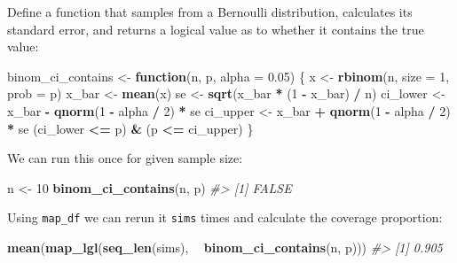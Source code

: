 \documentclass[]{book}
\newenvironment{Shaded}{\begin{snugshade}}{\end{snugshade}}
\newcommand{\KeywordTok}[1]{\textcolor[rgb]{0.13,0.29,0.53}{\textbf{#1}}}
\newcommand{\DataTypeTok}[1]{\textcolor[rgb]{0.13,0.29,0.53}{#1}}
\newcommand{\DecValTok}[1]{\textcolor[rgb]{0.00,0.00,0.81}{#1}}
\newcommand{\FloatTok}[1]{\textcolor[rgb]{0.00,0.00,0.81}{#1}}
\newcommand{\StringTok}[1]{\textcolor[rgb]{0.31,0.60,0.02}{#1}}
\newcommand{\CommentTok}[1]{\textcolor[rgb]{0.56,0.35,0.01}{\textit{#1}}}
\newcommand{\ControlFlowTok}[1]{\textcolor[rgb]{0.13,0.29,0.53}{\textbf{#1}}}
\newcommand{\OperatorTok}[1]{\textcolor[rgb]{0.81,0.36,0.00}{\textbf{#1}}}
\newcommand{\NormalTok}[1]{#1}
\theoremstyle{definition}
\theoremstyle{definition}
\theoremstyle{definition}
\theoremstyle{remark}
\begin{document}
Define a function that samples from a Bernoulli distribution, calculates
its standard error, and returns a logical value as to whether it
contains the true value:

\begin{Shaded}
\begin{Highlighting}[]
\NormalTok{binom_ci_contains <-}\StringTok{ }\ControlFlowTok{function}\NormalTok{(n, p, }\DataTypeTok{alpha =} \FloatTok{0.05}\NormalTok{) \{}
\NormalTok{  x <-}\StringTok{ }\KeywordTok{rbinom}\NormalTok{(n, }\DataTypeTok{size =} \DecValTok{1}\NormalTok{, }\DataTypeTok{prob =}\NormalTok{ p)}
\NormalTok{  x_bar <-}\StringTok{ }\KeywordTok{mean}\NormalTok{(x)}
\NormalTok{  se <-}\StringTok{ }\KeywordTok{sqrt}\NormalTok{(x_bar }\OperatorTok{*}\StringTok{ }\NormalTok{(}\DecValTok{1} \OperatorTok{-}\StringTok{ }\NormalTok{x_bar) }\OperatorTok{/}\StringTok{ }\NormalTok{n)}
\NormalTok{  ci_lower <-}\StringTok{ }\NormalTok{x_bar }\OperatorTok{-}\StringTok{ }\KeywordTok{qnorm}\NormalTok{(}\DecValTok{1} \OperatorTok{-}\StringTok{ }\NormalTok{alpha }\OperatorTok{/}\StringTok{ }\DecValTok{2}\NormalTok{) }\OperatorTok{*}\StringTok{ }\NormalTok{se}
\NormalTok{  ci_upper <-}\StringTok{ }\NormalTok{x_bar }\OperatorTok{+}\StringTok{ }\KeywordTok{qnorm}\NormalTok{(}\DecValTok{1} \OperatorTok{-}\StringTok{ }\NormalTok{alpha }\OperatorTok{/}\StringTok{ }\DecValTok{2}\NormalTok{) }\OperatorTok{*}\StringTok{ }\NormalTok{se}
\NormalTok{  (ci_lower }\OperatorTok{<=}\StringTok{ }\NormalTok{p) }\OperatorTok{&}\StringTok{ }\NormalTok{(p }\OperatorTok{<=}\StringTok{ }\NormalTok{ci_upper)}
\NormalTok{\}}
\end{Highlighting}
\end{Shaded}

We can run this once for given sample size:

\begin{Shaded}
\begin{Highlighting}[]
\NormalTok{n <-}\StringTok{ }\DecValTok{10}
\KeywordTok{binom_ci_contains}\NormalTok{(n, p)}
\CommentTok{#> [1] FALSE}
\end{Highlighting}
\end{Shaded}

Using \texttt{map\_df} we can rerun it \texttt{sims} times and calculate
the coverage proportion:

\begin{Shaded}
\begin{Highlighting}[]
\KeywordTok{mean}\NormalTok{(}\KeywordTok{map_lgl}\NormalTok{(}\KeywordTok{seq_len}\NormalTok{(sims), }\OperatorTok{~}\StringTok{ }\KeywordTok{binom_ci_contains}\NormalTok{(n, p)))}
\CommentTok{#> [1] 0.905}
\end{Highlighting}
\end{Shaded}
\end{document}
